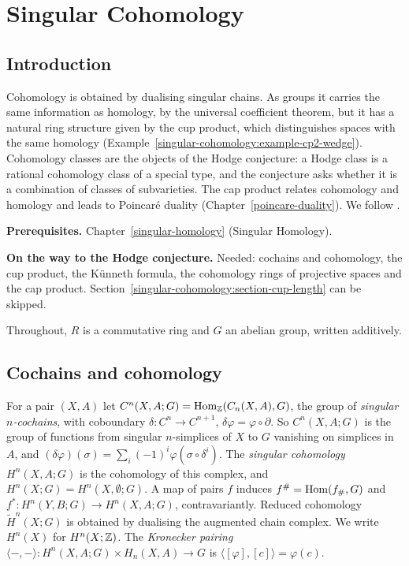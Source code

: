 \chapter{Singular Cohomology}\label{singular-cohomology}

\section{Introduction}\label{singular-cohomology:section-introduction}

Cohomology is obtained by dualising singular chains. As groups it carries the same information as homology, by the universal
coefficient theorem, but it has a natural ring structure given by the cup product, which distinguishes spaces with the same
homology (Example~\ref{singular-cohomology:example-cp2-wedge}). Cohomology classes are the objects of the Hodge conjecture: a
Hodge class is a rational cohomology class of a special type, and the conjecture asks whether it is a combination of classes of
subvarieties. The cap product relates cohomology and homology and leads to Poincar\'e duality (Chapter~\ref{poincare-duality}).
We follow \cite[Chapter 3]{hatcher-at}.

\noindent\textbf{Prerequisites.} Chapter~\ref{singular-homology} (Singular Homology).

\noindent\textbf{On the way to the Hodge conjecture.} Needed: cochains and cohomology, the cup product, the K\"unneth formula, the cohomology rings of projective spaces and the cap product.
Section~\ref{singular-cohomology:section-cup-length} can be skipped.

Throughout, $R$ is a commutative ring and $G$ an abelian group, written additively.

\section{Cochains and cohomology}\label{singular-cohomology:section-cochains}

\begin{definition}\label{singular-cohomology:definition-cohomology}
For a pair $(X, A)$ let $C^n(X, A; G) = \operatorname{Hom}_{\mathbb{Z}}(C_n(X, A), G)$, the group of \emph{singular $n$-cochains}, with coboundary
$\delta \colon C^n \to C^{n+1}$, $\delta\varphi = \varphi \circ \partial$. So $C^n(X, A; G)$ is the group of functions from singular $n$-simplices of $X$ to $G$ vanishing on
simplices in $A$, and $(\delta\varphi)(\sigma) = \sum_i(-1)^i\varphi(\sigma \circ \delta^i)$. The \emph{singular cohomology} $H^n(X, A; G)$ is the cohomology of this complex,
and $H^n(X; G) = H^n(X, \emptyset; G)$. A map of pairs $f$ induces $f^\# = \operatorname{Hom}(f_\#, G)$ and $f^* \colon H^n(Y, B; G) \to H^n(X, A; G)$, contravariantly. Reduced cohomology
$\tilde{H}^n(X; G)$ is obtained by dualising the augmented chain complex. We write $H^n(X)$ for $H^n(X; \mathbb{Z})$. The \emph{Kronecker pairing}
$\langle -, - \rangle \colon H^n(X, A; G) \times H_n(X, A) \to G$ is $\langle[\varphi], [c]\rangle = \varphi(c)$.
\end{definition}

